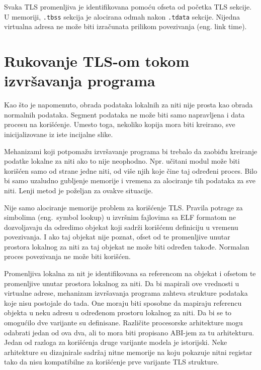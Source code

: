 \documentclass[12pt,oneside]{memoir}
\begin{document}
Svaka TLS promenljiva je identifikovana pomoću ofseta od početka TLS sekcije. U memoriji, \texttt{.tbss} sekcija je alocirana odmah nakon \texttt{.tdata} sekcije. Nijedna virtualna adresa ne može biti izračunata prilikom povezivanja (eng. link time).

\section{Rukovanje TLS-om tokom izvršavanja programa}

Kao što je napomenuto, obrada podataka lokalnih za niti nije prosta kao obrada normalnih podataka. Segment podataka ne može biti samo napravljena i data procesu na korišćenje. Umesto toga, nekoliko kopija mora biti kreirano, sve inicijalizovane iz iste incijalne slike.

Mehanizami koji potpomažu izvršavanje programa bi trebalo da zaobiđu kreiranje podatke lokalne za niti ako to nije neophodno. Npr. učitani modul može biti korišćen samo od strane jedne niti, od više njih koje čine taj određeni proces. Bilo bi samo uzaludno gubljenje memorije i vremena za alociranje tih podataka za sve niti. Lenji metod je poželjan za ovakve situacije.

Nije samo alociranje memorije problem za korišćenje TLS. Pravila potrage za simbolima (eng.~symbol lookup) u izvršnim fajlovima sa ELF formatom ne dozvoljavaju da odredimo objekat koji sadrži korišćenu definiciju u vremenu povezivanja. I ako taj objekat nije poznat, ofset od te promenljive unutar prostora lokalnog za niti za taj objekat ne može biti određen takođe. Normalan proces povezivanja ne može biti korišćen.

Promenljiva lokalna za nit je identifikovana sa referencom na objekat i ofsetom te promenljive unutar prostora lokalnog za niti. Da bi mapirali ove vrednosti u virtualne adrese, mehanizam izvršavanja programa zahteva strukture podataka koje nisu postojale do tada. One moraju biti sposobne da mapiraju referencu objekta u neku adresu u određenom prostoru lokalnog za niti. Da bi se to omogućilo dve varijante su definisane. Različite procesorske arhitekture mogu odabrati jedan od ova dva, ali to mora biti propisano ABI-jem za tu arhitekturu. Jedan od razloga za korišćenja druge varijante modela je istorijski. Neke arhitekture su dizajnirale sadržaj nitne memorije na koju pokazuje nitni registar tako da nisu kompatibilne za korišćenje prve varijante TLS strukture.
\end{document}

